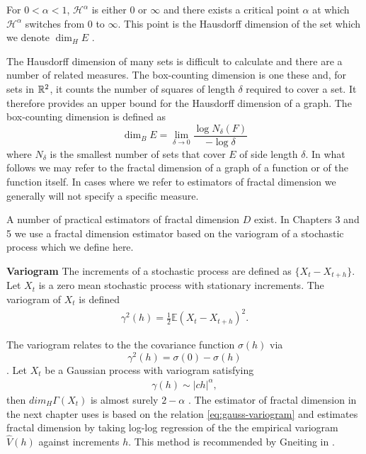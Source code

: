 For $0 < \alpha < 1$, $\mathcal{H}^{\alpha}$ is 
either $0$ or $\infty$ and there exists a critical point 
$\alpha$ at which $\mathcal{H}^{\alpha}$ switches from $0$ to 
$\infty$. This point is the Hausdorff dimension of the set 
which we denote $\dim_H E$ \cite{falconer2003}. 


The Hausdorff dimension of many sets is difficult to calculate and there are a number of related measures. 
The box-counting dimension is one these and, for sets in $\mathbb R^2$, 
it counts the number of squares of length $\delta$ required
to cover a set. It therefore provides an upper bound for the 
Hausdorff dimension of a graph. The box-counting dimension 
is defined as
\[
  \dim_B E = \lim_{\delta \to 0} \frac{ \log N_{\delta}(F)}
  {- \log \delta}
\]
where $N_{\delta}$ is the smallest number of sets 
that cover $E$ of side length $\delta$. In what follows 
we may refer to the fractal dimension of a graph of a function
or of the function itself. In cases where we refer to 
estimators of fractal dimension we generally will not specify
a specific measure.

A number of practical estimators of fractal dimension $D$
exist. In Chapters 3 and 5 we use a fractal dimension 
estimator based on the variogram of a stochastic process
which we define here. 
\begin{defn}{\textbf{Variogram} }\label{def:variogram}
The increments of a stochastic process are defined 
as $\{ X_t - X_{t+h} \}$.
Let $X_t$ is a zero mean stochastic process with 
stationary increments. The variogram of $X_t$ 
is  defined
\begin{align*}
  \gamma^2(h) = \frac{1}{2}\mathbb{E}\left(X_t - X_{t + h} \right)^2.
\end{align*}
\end{defn}
The variogram relates to the the covariance function  $\sigma(h)$ via 
\[
  \gamma^2(h) = \sigma(0) - \sigma(h)
\]
\cite{gneiting2012}. Let $X_t$ be a Gaussian 
process with variogram satisfying
\begin{align}\label{eq:gauss-variogram}
  \gamma(h) \sim|ch|^{\alpha},
\end{align}  
then $dim_H \Gamma(X_t)$ is almost surely $2 - \alpha$
\cite{gneiting2012} \cite{orey1970}. 
The estimator of fractal dimension in the next chapter 
uses is based on the relation \ref{eq:gauss-variogram}
and estimates fractal dimension by taking 
log-log regression of the 
the empirical variogram $\hat V(h)$ against increments
$h$. This method is recommended by Gneiting in \cite{gneiting2012}.
 
